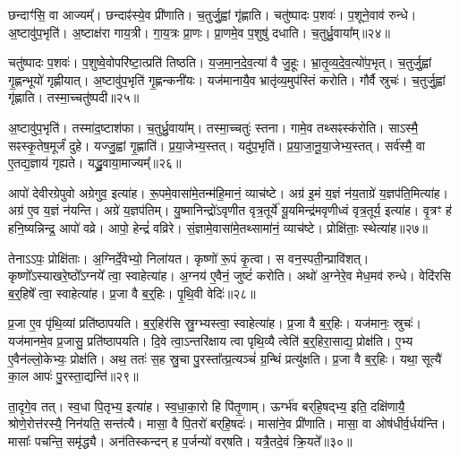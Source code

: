 छन्दाꣳ॑सि॒ वा आज्यम्᳚।
छन्दाꣴ॑स्ये॒व प्री॑णाति।
च॒तुर्जु॒ह्वां गृ॑ह्णाति।
चतु॑ष्पादः प॒शवः॑।
प॒शूने॒वाव॑ रुन्धे।
अ॒ष्टावु॑प॒भृति॑।
अ॒ष्टाक्ष॑रा गाय॒त्री।
गा॒य॒त्रः प्रा॒णः।
प्रा॒णमे॒व प॒शुषु॑ दधाति।
च॒तुर्ध्रु॒वाया᳚म्॥२४॥

चतु॑ष्पादः प॒शवः॑।
प॒शुष्वे॒वोपरि॑ष्टा॒त्प्रति॑ तिष्ठति।
य॒ज॒मा॒न॒दे॒व॒त्या॑ वै जु॒हूः।
भ्रा॒तृ॒व्य॒दे॒व॒त्यो॑प॒भृत्।
च॒तुर्जु॒ह्वां गृ॒ह्णन्भूयो॑ गृह्णीयात्।
अ॒ष्टावु॑प॒भृति॑ गृ॒ह्णन्कनी॑यः।
यज॑मानायै॒व भ्रातृ॑व्य॒मुप॑स्तिं करोति।
गौर्वै स्रुचः॑।
च॒तुर्जु॒ह्वां गृ॑ह्णाति।
तस्मा॒च्चतु॑ष्पदी॥२५॥

अ॒ष्टावु॑प॒भृति॑।
तस्मा॑द॒ष्टाश॑फा।
च॒तुर्ध्रु॒वाया᳚म्।
तस्मा॒च्चतुः॑ स्तना।
गामे॒व तथ्सꣴस्क॑रोति।
साऽस्मै॒ सꣴस्कृ॒तेष॒मूर्जं॑ दुहे।
यज्जु॒ह्वां गृ॒ह्णाति॑।
प्र॒या॒जेभ्य॒स्तत्।
यदु॑प॒भृति॑।
प्र॒या॒जा॒नू॒या॒जेभ्य॒स्तत्।
सर्व॑स्मै॒ वा ए॒तद्य॒ज्ञाय॑ गृह्यते।
यद्ध्रु॒वाया॒माज्यम्᳚॥२६॥\anuvakamend[अ॒भि॒घा॒रय॑ति गृह्णाति ध्रु॒वायां॒ चतु॑ष्पदी प्रयाजानूया॒जेभ्य॒स्तद्द्वे च॑]

आपो॑ देवीरग्रेपुवो अग्रेगुव॒ इत्या॑ह।
रू॒पमे॒वासा॑मे॒तन्म॑हि॒\-मानं॒ व्याच॑ष्टे।
अग्र॑ इ॒मं य॒ज्ञं न॑य॒ताग्रे॑ य॒ज्ञप॑ति॒मित्या॑ह।
अग्र॑ ए॒व य॒ज्ञं न॑यन्ति।
अग्रे॑ य॒ज्ञप॑तिम्।
यु॒ष्मानिन्द्रो॑\-ऽवृणीत वृत्र॒तूर्ये॑ यू॒यमिन्द्र॑मवृणीध्वं वृत्र॒तूर्य॒ इत्या॑ह।
वृ॒त्रꣳ ह॑ हनि॒ष्यन्निन्द्र॒ आपो॑ वव्रे।
आपो॒ हेन्द्रं॑ वव्रिरे।
सं॒ज्ञामे॒वासा॑मे॒तथ्सामा॑नं॒ व्याच॑ष्टे।
प्रोक्षि॑ताः॒ स्थेत्या॑ह॥२७॥

तेनाऽऽपः॒ प्रोक्षि॑ताः।
अ॒ग्निर्दे॒वेभ्यो॒ निला॑यत।
कृष्णो॑ रू॒पं कृ॒त्वा।
स वन॒स्पती॒न्प्रावि॑शत्।
कृष्णो᳚\-ऽस्याखरे॒ष्ठो᳚\-ऽग्नये᳚ त्वा॒ स्वाहे\-त्या॑ह।
अ॒ग्नय॑ ए॒वैनं॒ जुष्टं॑ करोति।
अथो॑ अ॒ग्नेरे॒व मेध॒मव॑ रुन्धे।
वेदि॑\-रसि ब॒र्॒हिषे᳚ त्वा॒ स्वाहेत्या॑ह।
प्र॒जा वै ब॒र्॒हिः।
पृ॒थि॒वी वेदिः॑॥२८॥

प्र॒जा ए॒व पृ॑थि॒व्यां प्रति॑\-ष्ठापयति।
ब॒र्॒हिर॑सि स्रु॒ग्भ्यस्त्वा॒ स्वाहेत्या॑ह।
प्र॒जा वै ब॒र्॒हिः।
यज॑मानः॒ स्रुचः॑।
यज॑मानमे॒व प्र॒जासु॒ प्रति॑\-ष्ठापयति।
दि॒वे त्वा॒\-ऽन्तरि॑क्षाय त्वा पृथि॒व्यै त्वेति॑ ब॒र्॒हिरा॒साद्य॒ प्रोक्ष॑ति।
ए॒भ्य ए॒वैन॑ल्लो॒केभ्यः॒ प्रोक्ष॑ति।
अथ॒ ततः॑ स॒ह स्रु॒चा पु॒रस्ता᳚त्प्र॒त्यञ्चं॑ ग्र॒न्थिं प्रत्यु॑क्षति।
प्र॒जा वै ब॒र्॒हिः।
यथा॒ सूत्यै॑ का॒ल आपः॑ पु॒रस्ता॒द्यन्ति॑॥२९॥

ता॒दृगे॒व तत्।
स्व॒धा पि॒तृभ्य॒ इत्या॑ह।
स्व॒धा॒का॒रो हि पि॑तृ॒णाम्।
ऊर्ग्भ॑व बर्‌\mbox{}हि॒षद्भ्य॒ इति॒ दक्षि॑णायै॒ श्रोणे॒रोत्त॑रस्यै॒ निन॑यति॒ सन्त॑त्यै।
मासा॒ वै पि॒तरो॑ बर्‌\mbox{}हि॒षदः॑।
मासा॑ने॒व प्री॑णाति।
मासा॒ वा ओष॑धीर्व॒र्धय॑न्ति।
मासाः᳚ पचन्ति॒ समृ॑द्ध्यै।
अन॑तिस्कन्दन् ह प॒र्जन्यो॑ वर्‌\mbox{}षति।
यत्रै॒तदे॒वं क्रि॒यते᳚॥३०॥


